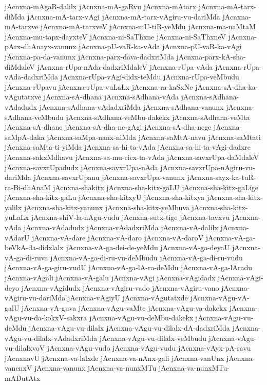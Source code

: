 {jAcnxna-mAgaR-dalilx
jAcnxna-mA-gaRvu
jAcnxna-mAtarx
jAcnxna-mA-tarx-diMda
jAcnxna-mA-tarx-vAgi
jAcnxna-mA-tarx-vAgiru-vu-dariMda
jAcnxna-mA-tarxve
jAcnxna-mA-tarxveV
jAcnxna-mU-tiR-yeMdu
jAcnxna-ma-naMtaM
jAcnxna-mu-tapx-dayxteV
jAcnxna-ni-SaThxne
jAcnxna-ni-SaThxneV
jAcnxna-pArx-dhAnayx-vanunx
jAcnxna-pU-vaR-ka-vAda
jAcnxna-pU-vaR-ka-vAgi
jAcnxna-pa-da-vanunx
jAcnxna-parx-dava-dadxriMda
jAcnxna-parx-kA-sha-diMdaleV
jAcnxna-rUpa-nAda-dadxriMdaleV
jAcnxna-rUpa-vAda
jAcnxna-rUpa-vAda-dadxriMda
jAcnxna-rUpa-vAgi-didx-teMdu
jAcnxna-rUpa-veMbudu
jAcnxna-rUpavu
jAcnxna-rUpa-vuLaLx
jAcnxna-ra-kaSxNe
jAcnxna-sA-dha-ka-vAgutatxve
jAcnxna-sA-dhana
jAcnxna-sAdhana-vAda
jAcnxna-sAdhana-vAdadudx
jAcnxna-sAdhana-vAdadxriMda
jAcnxna-sAdhana-vanunx
jAcnxna-sAdhana-veMbudu
jAcnxna-sAdhana-veMbu-dakekx
jAcnxna-sAdhana-veMta
jAcnxna-sA-dhane
jAcnxna-sA-dha-ne-gAgi
jAcnxna-sA-dha-nege
jAcnxna-saMpA-daka
jAcnxna-saMpa-nanx-niMda
jAcnxna-saMtA-navu
jAcnxna-saMtati
jAcnxna-saMta-ti-yiMda
jAcnxna-sa-hi-ta-vAda
jAcnxna-sa-hi-ta-vAgi-dadxre
jAcnxna-sakxMdhavu
jAcnxna-sa-mu-cicx-ta-vAda
jAcnxna-savxrUpa-daMdaleV
jAcnxna-savxrUpadudx
jAcnxna-savxrUpa-nAda
jAcnxna-savxrUpa-nAgiru-vu-dariMda
jAcnxna-savxrUpanu
jAcnxna-savxrUpa-vanunx
jAcnxna-sayx-ka-tuR-ra-Bi-dhAnaM
jAcnxna-shakitx
jAcnxna-sha-kitx-gaLU
jAcnxna-sha-kitx-gaLige
jAcnxna-sha-kitx-gaLu
jAcnxna-sha-kitxyU
jAcnxna-sha-kitxya
jAcnxna-sha-kitx-yalilx
jAcnxna-sha-kitx-yanunx
jAcnxna-sha-kitx-yeMbuva
jAcnxna-sha-kitx-yuLaLx
jAcnxna-shiV-la-nAgu-vudu
jAcnxna-sutx-tige
jAcnxna-tavxvu
jAcnxna-vAda
jAcnxna-vAdadudx
jAcnxna-vAdadxriMda
jAcnxna-vA-dalilx
jAcnxna-vAdarU
jAcnxna-vA-dare
jAcnxna-vA-daro
jAcnxna-vA-daroV
jAcnxna-vA-ga-beVkA-da-didxlalx
jAcnxna-vA-ga-dei-de-yeMdu
jAcnxna-vA-ga-deyaU
jAcnxna-vA-ga-di-ruva
jAcnxna-vA-ga-di-ru-vu-deMbudu
jAcnxna-vA-ga-di-ru-vudu
jAcnxna-vA-ga-giru-vudU
jAcnxna-vA-ga-lA-ra-deMdu
jAcnxna-vA-ga-lAradu
jAcnxna-vAgali
jAcnxna-vA-galu
jAcnxna-vAgi
jAcnxna-vAgidadx
jAcnxna-vAgi-deyo
jAcnxna-vAgidudx
jAcnxna-vAgiru-vado
jAcnxna-vAgiru-vano
jAcnxna-vAgiru-vu-dariMda
jAcnxna-vAgiyU
jAcnxna-vAgutatxde
jAcnxna-vAgu-vA-galU
jAcnxna-vA-guva
jAcnxna-vAgu-vaMte
jAcnxna-vAgu-va-dakekx
jAcnxna-vAgu-vu-da-kokxV-sakxra
jAcnxna-vAgu-vu-deMbu-dakekx
jAcnxna-vAgu-vu-deMdu
jAcnxna-vAgu-vu-dilalx
jAcnxna-vAgu-vu-dilalx-dA-dadxriMda
jAcnxna-vAgu-vu-dilalx-vAdadxriMda
jAcnxna-vAgu-vu-dilalx-veMbudu
jAcnxna-vAgu-vu-dilalxvoV
jAcnxna-vAgu-vudo
jAcnxna-vAgu-vudu
jAcnxna-vAyx-pA-ravu
jAcnxnavU
jAcnxna-va-lalxde
jAcnxna-va-nAnx-gali
jAcnxna-vanUnx
jAcnxna-vanenxV
jAcnxna-vanunx
jAcnxna-va-nunxMTu
jAcnxna-va-nunxMTu-mADutAtx
}
